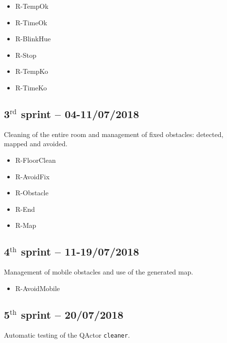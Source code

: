 \begin{itemize}
	\ttfamily
	\item R-TempOk
	\item R-TimeOk
	\item R-BlinkHue
	\item R-Stop
	\item R-TempKo
	\item R-TimeKo
\end{itemize}

\subsection{3$^{\textrm{rd}}$ sprint -- 04-11/07/2018}
Cleaning of the entire room and management of fixed obstacles: detected, mapped and avoided.

\begin{itemize}
	\ttfamily
	\item R-FloorClean
	\item R-AvoidFix
	\item R-Obstacle
	\item R-End
	\item R-Map
\end{itemize}

\subsection{4$^{\textrm{th}}$ sprint -- 11-19/07/2018}
Management of mobile obstacles and use of the generated map.

\begin{itemize}
	\ttfamily
	\item R-AvoidMobile
\end{itemize}

\subsection{5$^{\textrm{th}}$ sprint -- 20/07/2018}
Automatic testing of the QActor \texttt{cleaner}.


